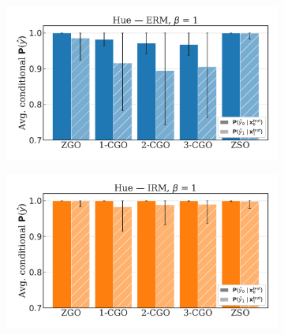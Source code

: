 \begin{figure}[H]
    \centering
    \begin{subfigure}[b]{0.45\textwidth}
        \centering
        \includegraphics[width=\textwidth]{img/model_selection/posterior_erm_hue.pdf}
    \end{subfigure}
    \hfill
    \begin{subfigure}[b]{0.45\textwidth}
        \centering
        \includegraphics[width=\textwidth]{img/model_selection/posterior_irm_hue.pdf}
    \end{subfigure}

    \vspace{1em}


\end{figure}
